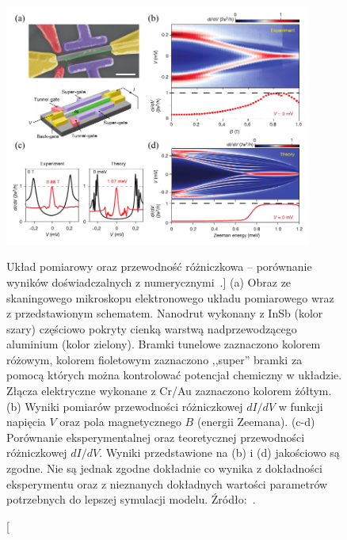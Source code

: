 \begin{figure}
    \centering
    \includegraphics[width=0.9\textwidth]{04-Includes/Figures/Observe/observe4.pdf}
    \caption
    [Układ pomiarowy oraz przewodność różniczkowa -- porównanie wyników doświadczalnych z numerycznymi~\cite{zhang.liu.2018}.]
{%
    (a) Obraz ze skaningowego mikroskopu elektronowego układu pomiarowego wraz z przedstawionym schematem.
    Nanodrut wykonany z InSb (kolor szary) częściowo pokryty cienką warstwą nadprzewodzącego aluminium (kolor zielony).
    Bramki tunelowe zaznaczono kolorem różowym, kolorem fioletowym zaznaczono ,,super'' bramki za pomocą których można kontrolować potencjał chemiczny w układzie.
    Złącza elektryczne wykonane z Cr/Au zaznaczono kolorem żółtym.
    (b) Wyniki pomiarów przewodności różniczkowej $dI/dV$ w funkcji napięcia $V$ oraz pola magnetycznego $B$ (energii Zeemana).
    (c-d) Porównanie eksperymentalnej oraz teoretycznej przewodności różniczkowej $dI/dV$.
    Wyniki przedstawione na (b) i (d) jakościowo są zgodne.
    Nie są jednak zgodne dokładnie co wynika z dokładności eksperymentu oraz z nieznanych dokładnych wartości parametrów potrzebnych do %
    lepszej symulacji modelu.
    Źródło:~\cite{zhang.liu.2018}.
}
    \label{fig:observe4}
\end{figure}

